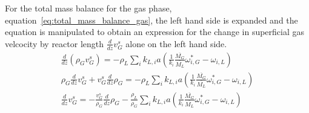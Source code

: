 \documentclass{article}
\begin{document}
For the total mass balance for the gas phase, equation~\ref{eq:total_mass_balance_gas}, the left hand side is expanded and the equation is manipulated to obtain an expression for the change in superficial gas velcocity by reactor length $\frac{d}{dz}v_G^s$ alone on the left hand side.
\begin{equation}
	\begin{split}
	\frac{d}{dz}\left(\rho_Gv_G^s\right) =-\rho_L\sum_ik_{L,i}a(\frac{1}{k_i}\frac{\overline{M_G}}{\overline{M_L}}\omega_{i,G}^*-\omega_{i,L})\\
	\rho_G\frac{d}{dz}v_G^s + v_G^s\frac{d}{dz}\rho_G =-\rho_L\sum_ik_{L,i}a(\frac{1}{k_i}\frac{\overline{M_G}}{\overline{M_L}}\omega_{i,G}^*-\omega_{i,L})\\
	\frac{d}{dz}v_G^s = -\frac{v_G^s}{\rho_G}\frac{d}{dz}\rho_G - \frac{\rho_L}{\rho_G}\sum_ik_{L,i}a(\frac{1}{k_i}\frac{\overline{M_G}}{\overline{M_L}}\omega_{i,G}^*-\omega_{i,L})
	\label{eq:total_balance_gas_manipulations}
	\end{split}
\end{equation}
\end{document}
